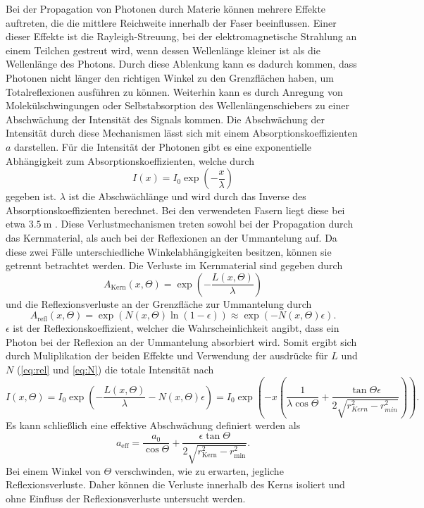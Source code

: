 Bei der Propagation von Photonen durch Materie können mehrere Effekte auftreten, die die mittlere Reichweite innerhalb der Faser beeinflussen.
Einer dieser Effekte ist die Rayleigh-Streuung, bei der elektromagnetische Strahlung an einem Teilchen gestreut wird, wenn dessen Wellenlänge
kleiner ist als die Wellenlänge des Photons. Durch diese Ablenkung kann es dadurch kommen, dass Photonen nicht länger den richtigen Winkel zu den
Grenzflächen haben, um Totalreflexionen ausführen zu können. Weiterhin kann es durch Anregung von Molekülschwingungen oder Selbstabsorption
des Wellenlängenschiebers zu einer Abschwächung der Intensität des Signals kommen. Die Abschwächung der Intensität durch diese Mechanismen lässt sich
mit einem Absorptionskoeffizienten $a$ darstellen. Für die Intensität der Photonen gibt es eine exponentielle Abhängigkeit
zum Absorptionskoeffizienten, welche durch
\begin{equation}
    I(x) = I_0 \exp\left(-\frac{x}{\lambda}\right)
\end{equation}
gegeben ist. $\lambda$ ist die Abschwächlänge und wird durch das Inverse des Absorptionskoeffizienten berechnet. Bei den verwendeten Fasern
liegt diese bei etwa $\qty{3.5}{\metre}$ \cite{SciFi_Versuch}. Diese Verlustmechanismen treten sowohl bei der Propagation durch das Kernmaterial,
als auch bei der Reflexionen an der Ummantelung auf. Da diese zwei Fälle unterschiedliche Winkelabhängigkeiten besitzen, können sie
getrennt betrachtet werden. Die Verluste im Kernmaterial sind gegeben durch
\begin{equation}
    A_{\text{Kern}}(x, \Theta) = \exp{\left(- \frac{L(x,\Theta)}{\lambda}\right)}
\end{equation}
und die Reflexionsverluste an der Grenzfläche zur Ummantelung durch
\begin{equation}
    A_{\text{refl}}(x, \Theta) = \exp{\left(N(x,\Theta) \ln{(1-\epsilon)}\right)} \approx \exp{\left( -N(x,\Theta) \epsilon \right)}.
\end{equation}
$\epsilon$ ist der Reflexionskoeffizient, welcher die Wahrscheinlichkeit angibt, dass ein Photon bei der Reflexion an der Ummantelung absorbiert wird.
Somit ergibt sich durch Muliplikation der beiden Effekte und Verwendung der ausdrücke für $L$ und $N$ (\autoref{eq:rel} und \ref{eq:N}) die totale Intensität nach
\begin{equation}
    I(x,\Theta) = I_0  \exp{\left( - \frac{L(x,\Theta)}{\lambda}-N(x,\Theta) \epsilon \right)} = I_0  \exp{\left(-x \left( \frac{1}{\lambda\cos{\Theta}}+\frac{ \tan{\Theta}\epsilon}{2 \sqrt{r^2_{Kern} - r^2_{min}}} \right) \right)}.
\end{equation}
Es kann schließlich eine effektive Abschwächung definiert werden als
\begin{equation}
    \label{eq:absorption}
    a_{\text{eff}} = \frac{a_0}{\cos{\Theta}} + \frac{\epsilon \tan{\Theta}}{2 \sqrt{r^2_{\text{Kern}} - r^2_{\text{min}}}}.
\end{equation}
Bei einem Winkel von $\Theta$ verschwinden, wie zu erwarten, jegliche Reflexionsverluste. Daher können die Verluste innerhalb des Kerns
isoliert und ohne Einfluss der Reflexionsverluste untersucht werden.

